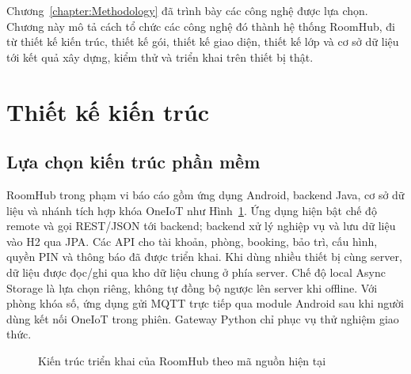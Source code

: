 \documentclass[../DoAn.tex]{subfiles}
\begin{document}
Chương~\ref{chapter:Methodology} đã trình bày các công nghệ được lựa chọn. Chương này mô tả cách tổ chức các công nghệ đó thành hệ thống RoomHub, đi từ thiết kế kiến trúc, thiết kế gói, thiết kế giao diện, thiết kế lớp và cơ sở dữ liệu tới kết quả xây dựng, kiểm thử và triển khai trên thiết bị thật.

\section{Thiết kế kiến trúc}
\subsection{Lựa chọn kiến trúc phần mềm}
RoomHub trong phạm vi báo cáo gồm ứng dụng Android, backend Java, cơ sở dữ liệu và nhánh tích hợp khóa OneIoT như Hình~\ref{fig:kientruc}. Ứng dụng hiện bật chế độ remote và gọi REST/JSON tới backend; backend xử lý nghiệp vụ và lưu dữ liệu vào H2 qua JPA. Các API cho tài khoản, phòng, booking, bảo trì, cấu hình, quyền PIN và thông báo đã được triển khai. Khi dùng nhiều thiết bị cùng server, dữ liệu được đọc/ghi qua kho dữ liệu chung ở phía server. Chế độ local Async Storage là lựa chọn riêng, không tự đồng bộ ngược lên server khi offline. Với phòng khóa số, ứng dụng gửi MQTT trực tiếp qua module Android sau khi người dùng kết nối OneIoT trong phiên. Gateway Python chỉ phục vụ thử nghiệm giao thức.

\begin{figure}[H]
\centering
{}
\caption{Kiến trúc triển khai của RoomHub theo mã nguồn hiện tại}
\label{fig:kientruc}
\end{figure}
\end{document}
